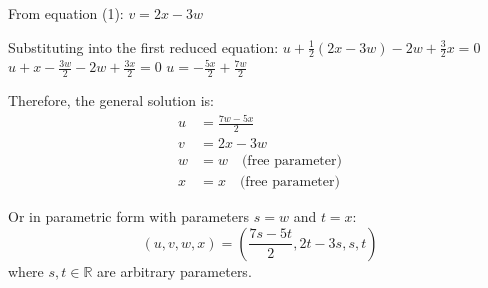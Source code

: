 From equation (1): $v = 2x - 3w$

Substituting into the first reduced equation:
$u + \frac{1}{2}(2x - 3w) - 2w + \frac{3}{2}x = 0$
$u + x - \frac{3w}{2} - 2w + \frac{3x}{2} = 0$
$u = -\frac{5x}{2} + \frac{7w}{2}$

Therefore, the general solution is:
\begin{align*}
	u & = \frac{7w - 5x}{2}               \\
	v & = 2x - 3w                         \\
	w & = w \quad \text{(free parameter)} \\
	x & = x \quad \text{(free parameter)}
\end{align*}

Or in parametric form with parameters $s = w$ and $t = x$:
\[
	\boxed{(u, v, w, x) = \left(\frac{7s - 5t}{2}, 2t - 3s, s, t\right)}
\]
where $s, t \in \mathbb{R}$ are arbitrary parameters.